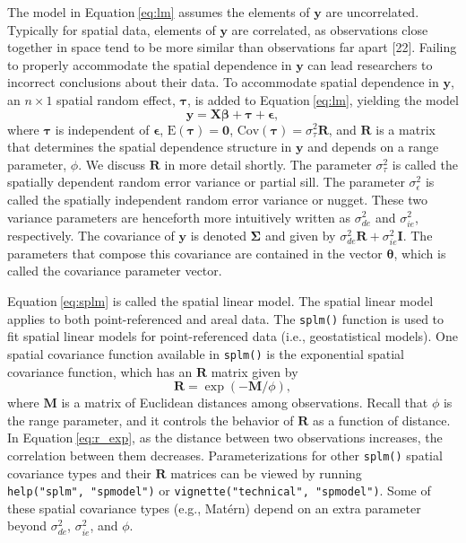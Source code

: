 \documentclass[10pt,letterpaper]{article}
\begin{document}
The model in Equation\(~\)\ref{eq:lm} assumes the elements of
\(\mathbf{y}\) are uncorrelated. Typically for spatial data, elements of
\(\mathbf{y}\) are correlated, as observations close together in space
tend to be more similar than observations far apart {[}22{]}. Failing to
properly accommodate the spatial dependence in \(\mathbf{y}\) can lead
researchers to incorrect conclusions about their data. To accommodate
spatial dependence in \(\mathbf{y}\), an \(n \times 1\) spatial random
effect, \(\boldsymbol{\tau}\), is added to Equation\(~\)\ref{eq:lm},
yielding the model \begin{equation}\label{eq:splm}
 \mathbf{y} = \mathbf{X} \boldsymbol{\beta} + \boldsymbol{\tau} + \boldsymbol{\epsilon},
\end{equation} where \(\boldsymbol{\tau}\) is independent of
\(\boldsymbol{\epsilon}\), \(\text{E}(\boldsymbol{\tau}) = \mathbf{0}\),
\(\text{Cov}(\boldsymbol{\tau}) = \sigma^2_\tau \mathbf{R}\), and
\(\mathbf{R}\) is a matrix that determines the spatial dependence
structure in \(\mathbf{y}\) and depends on a range parameter, \(\phi\).
We discuss \(\mathbf{R}\) in more detail shortly. The parameter
\(\sigma^2_\tau\) is called the spatially dependent random error
variance or partial sill. The parameter \(\sigma^2_\epsilon\) is called
the spatially independent random error variance or nugget. These two
variance parameters are henceforth more intuitively written as
\(\sigma^2_{de}\) and \(\sigma^2_{ie}\), respectively. The covariance of
\(\mathbf{y}\) is denoted \(\boldsymbol{\Sigma}\) and given by
\(\sigma^2_{de} \mathbf{R} + \sigma^2_{ie} \mathbf{I}\). The parameters
that compose this covariance are contained in the vector
\(\boldsymbol{\theta}\), which is called the covariance parameter
vector.

Equation\(~\)\ref{eq:splm} is called the spatial linear model. The
spatial linear model applies to both point-referenced and areal data.
The \texttt{splm()} function is used to fit spatial linear models for
point-referenced data (i.e., geostatistical models). One spatial
covariance function available in \texttt{splm()} is the exponential
spatial covariance function, which has an \(\mathbf{R}\) matrix given by
\begin{equation}\label{eq:r_exp}
  \mathbf{R} = \exp(-\mathbf{M} / \phi),
\end{equation} where \(\mathbf{M}\) is a matrix of Euclidean distances
among observations. Recall that \(\phi\) is the range parameter, and it
controls the behavior of \(\mathbf{R}\) as a function of distance. In
Equation\(~\)\ref{eq:r_exp}, as the distance between two observations
increases, the correlation between them decreases. Parameterizations for
other \texttt{splm()} spatial covariance types and their \(\mathbf{R}\)
matrices can be viewed by running \texttt{help("splm",\ "spmodel")} or
\texttt{vignette("technical",\ "spmodel")}. Some of these spatial
covariance types (e.g., Matérn) depend on an extra parameter beyond
\(\sigma^2_{de}\), \(\sigma^2_{ie}\), and \(\phi\).
\end{document}
